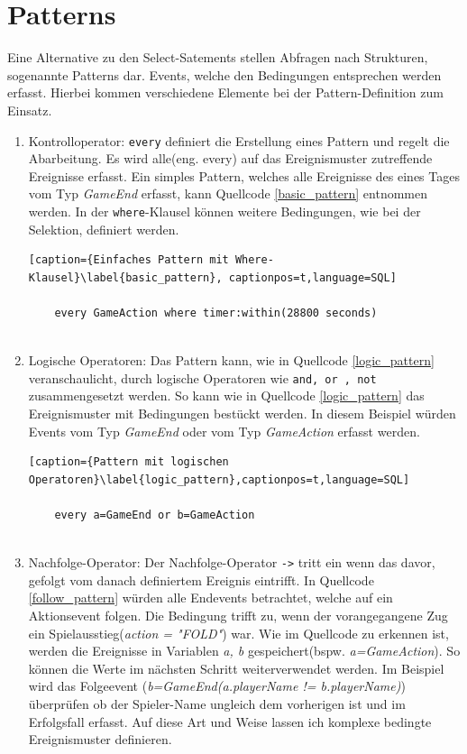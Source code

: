 \section{Patterns}

Eine Alternative zu den Select-Satements stellen Abfragen nach Strukturen, sogenannte Patterns dar. Events, welche den Bedingungen entsprechen werden erfasst. Hierbei kommen verschiedene Elemente bei der Pattern-Definition zum Einsatz.

\begin{enumerate}
	\item Kontrolloperator: \texttt{every} definiert die Erstellung eines Pattern und regelt die Abarbeitung. Es wird alle(eng. every) auf das Ereignismuster zutreffende Ereignisse erfasst. Ein simples Pattern, welches alle Ereignisse des eines Tages vom Typ \textit{GameEnd} erfasst, kann Quellcode \ref{basic_pattern} entnommen werden.
	In der \texttt{where}-Klausel können weitere Bedingungen, wie bei der Selektion, definiert werden.
	
	\begin{lstlisting}[caption={Einfaches Pattern mit Where-Klausel}\label{basic_pattern}, captionpos=t,language=SQL]
	
	every GameAction where timer:within(28800 seconds)
	
	\end{lstlisting}
	
	\item Logische Operatoren: 
	Das Pattern kann, wie in Quellcode \ref{logic_pattern} veranschaulicht, durch logische Operatoren wie \texttt{and, or , not} zusammengesetzt werden. So kann wie in Quellcode \ref{logic_pattern} das Ereignismuster mit Bedingungen bestückt werden. In diesem Beispiel würden Events vom Typ \textit{GameEnd} oder vom Typ \textit{GameAction} erfasst werden.
	
	\begin{lstlisting}[caption={Pattern mit logischen Operatoren}\label{logic_pattern},captionpos=t,language=SQL]
	
	every a=GameEnd or b=GameAction
	
	\end{lstlisting}
	
	\item Nachfolge-Operator:
	Der Nachfolge-Operator \texttt{->} tritt ein wenn das davor, gefolgt vom danach definiertem Ereignis eintrifft. In Quellcode \ref{follow_pattern}  würden alle Endevents betrachtet, welche auf ein Aktionsevent folgen. Die Bedingung trifft zu, wenn der vorangegangene Zug ein Spielausstieg(\textit{action = "FOLD"}) war.
	Wie im Quellcode zu erkennen ist, werden die Ereignisse in Variablen \textit{a, b} gespeichert(bspw. \textit{a=GameAction}). So können die Werte im nächsten Schritt weiterverwendet werden. Im Beispiel wird das Folgeevent (\textit{b=GameEnd(a.playerName != b.playerName)}) überprüfen ob der Spieler-Name ungleich dem vorherigen ist und im Erfolgsfall erfasst. Auf diese Art und Weise lassen ich komplexe bedingte Ereignismuster definieren.
	

\end{enumerate}
